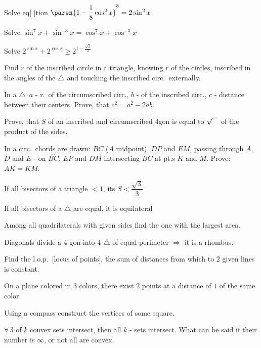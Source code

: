 \documentclass{article}
\newcommand{\strikethrough}[1]{}  %
\begin{document}
\problem  %
Solve eq[ ]tion
$\paren{1 - \dfrac{1}{8} \cos^{2}{x}}^{8} = 2 \sin^{2}{x}$


\problem  %
Solve $\sin^{7}{x} + \sin^{-3}{x} = \cos^{7}{x} + \cos^{-3}{x}$


\problem  %
Solve $2^{\sin{x}} + 2^{\cos{x}} \geq 2^{1 - \frac{\sqrt{2}}{2}}$


\problem  %
Find $r$ of the inscribed circle in a triangle, knowing $r$ of the circles, inscribed in the angles of the $\triangle$ and touching the inscribed circ.\ externally.


\problem  %
In a $\triangle \,$ $a$ - r.\ of the circumscribed circ., $b$ - of the inscribed circ., $c$ - distance between their centers.
Prove, that $c^2 = a^2 - 2 a b$.


\problem  %
Prove, that $S$ of an inscribed and circumscribed $4$gon is equal to $\sqrt{\vphantom{A} \hphantom{A}}\mspace{1mu}$ of the product of the sides.


\problem  %
\newcommand{\invarc}[1]{\stackrel{\smile}{#1}}
In a circ.\ chords are drawn: $BC$ ($A$ midpoint), $DP$ and $EM$, passing through $A$,
$D$ and $E$ - on $\invarc{BC}$, $EP$ and $DM$ intersecting $BC$ at pt.s $K$ and $M$.
Prove: $AK = KM$.


\problem  %
If all bisectors of a triangle $< 1$, its $S < \dfrac{\sqrt{3}}{3}$


\problem  %
If all bisectors of a $\triangle$ are equal, it is \strikethrough{isosceles} equilateral


\problem  %
Among all quadrilaterals with given sides find the one with the largest area.


\problem  %
Diagonals divide a $4$-gon into $4$ $\triangle$ of equal perimeter $\Rightarrow$ it is a rhombus.


\problem  %
Find the l.o.p.\ [locus of points], the sum of distances from which to $2$ given lines is constant.


\problem  %
On a plane colored in $3$ colors, there exist $2$ points at a distance of $1$ of the same color.


\problem  %
Using a compass construct the vertices of some square.


\problem  %
$\forall \, 3$ of $k$ convex sets intersect, then all $k$ - sets intersect.
What can be said if their number is $\infty$, or not all are convex.
\end{document}
